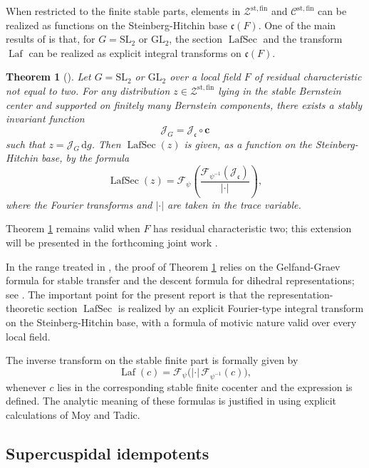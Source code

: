 \documentclass[iccmp]{ipbook}
\newcommand{\CC}{{\mathcal {C}}}
\newcommand{\CF}{{\mathcal {F}}}
\newcommand{\CJ}{{\mathcal {J}}}
\newcommand{\CZ}{{\mathcal {Z}}}
\newcommand{\Fc}{{\mathfrak {c}}}
\newcommand{\GL}{{\mathrm{GL}}}
\newcommand{\SL}{{\mathrm{SL}}}
\newcommand{\st}{{\mathrm{st}}}
\newcommand{\ud}{\,\mathrm{d}}
\newcommand{\Laf}{\operatorname{Laf}}
\newcommand{\LafSec}{\operatorname{LafSec}}
\newcommand{\fin}{\mathrm{fin}}
\newtheorem{thm}{Theorem}[subsection]
\def\bc{\mathbf{c}}
\begin{document}
When restricted to the finite stable parts, elements in $\CZ^{\st,\fin}$ and
$\CC^{\st,\fin}$ can be realized as functions on the Steinberg-Hitchin base $\Fc(F)$.
One of the main results of \cite{LN} is that, for $G=\SL_2$ or $\GL_2$, the section
$\LafSec$ and the transform $\Laf$ can be realized as explicit integral transforms on
$\Fc(F)$.

\begin{thm}[{\cite[Thm.~5.1.3]{LN}}]\label{thm:stable-Laf}
Let $G=\SL_2$ or $\GL_2$ over a local field $F$ of residual characteristic not equal to two.
For any distribution $z\in \CZ^{\st,\fin}$ lying in the stable Bernstein center and supported
on finitely many Bernstein components, there exists a stably invariant function
\[
\CJ_G=\CJ_\Fc\circ \bc
\]
such that $z=\CJ_G\ud g$. Then $\LafSec(z)$ is given, as a function on the
Steinberg-Hitchin base, by the formula
\begin{equation}\label{eq:Laf-formula}
\LafSec(z)=
\CF_\psi\left(
\frac{\CF_{\psi^{-1}}(\CJ_\Fc)}{|\cdot|}
\right),
\end{equation}
where the Fourier transforms and $|\cdot|$ are taken in the trace variable.
\end{thm}

Theorem \ref{thm:stable-Laf} remains valid when $F$ has residual characteristic two; this extension will be presented in the forthcoming joint work \cite{NL-general}.

In the range treated in \cite{LN}, the proof of Theorem \ref{thm:stable-Laf} relies on
the Gelfand-Graev formula for stable transfer and the descent formula for dihedral
representations; see \cite[\S 5--6]{LN}. The
important point for the present report is that the representation-theoretic section
$\LafSec$ is realized by an explicit Fourier-type integral transform on the Steinberg-Hitchin
base, with a formula of motivic nature valid over every local field.

The inverse transform on the stable finite part is formally given by
\begin{equation}\label{eq:Laf-inverse-formula}
\Laf(c)=
\CF_\psi\big(
|\cdot|\,\CF_{\psi^{-1}}(c)
\big),
\end{equation}
whenever $c$ lies in the corresponding stable finite cocenter and the expression is defined.
The analytic meaning of these formulas is justified in \cite[\S 5.5]{LN} using explicit
calculations of Moy and Tadic.

\subsection{Supercuspidal idempotents}\label{subsec:Laf-supercuspidal}
\end{document}
